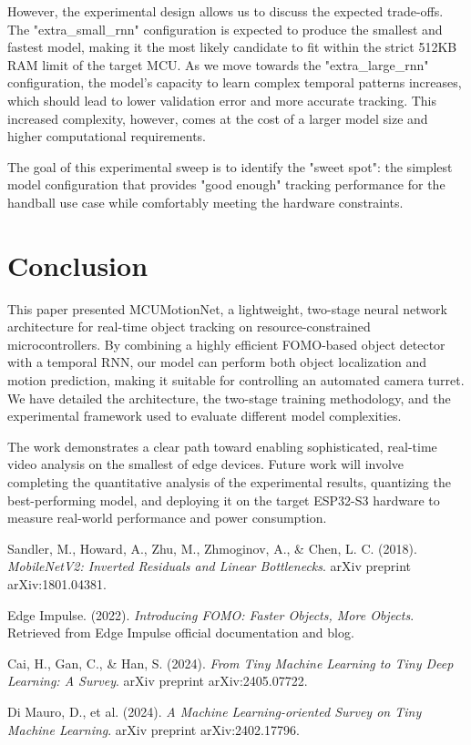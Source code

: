 \documentclass{article}
\begin{document}
However, the experimental design allows us to discuss the expected trade-offs. The "extra\_small\_rnn" configuration is expected to produce the smallest and fastest model, making it the most likely candidate to fit within the strict 512KB RAM limit of the target MCU. As we move towards the "extra\_large\_rnn" configuration, the model's capacity to learn complex temporal patterns increases, which should lead to lower validation error and more accurate tracking. This increased complexity, however, comes at the cost of a larger model size and higher computational requirements.

The goal of this experimental sweep is to identify the "sweet spot": the simplest model configuration that provides "good enough" tracking performance for the handball use case while comfortably meeting the hardware constraints.

\section{Conclusion}
This paper presented MCUMotionNet, a lightweight, two-stage neural network architecture for real-time object tracking on resource-constrained microcontrollers. By combining a highly efficient FOMO-based object detector with a temporal RNN, our model can perform both object localization and motion prediction, making it suitable for controlling an automated camera turret. We have detailed the architecture, the two-stage training methodology, and the experimental framework used to evaluate different model complexities.

The work demonstrates a clear path toward enabling sophisticated, real-time video analysis on the smallest of edge devices. Future work will involve completing the quantitative analysis of the experimental results, quantizing the best-performing model, and deploying it on the target ESP32-S3 hardware to measure real-world performance and power consumption.

\begin{thebibliography}{9}

Sandler, M., Howard, A., Zhu, M., Zhmoginov, A., \& Chen, L. C. (2018).
\textit{MobileNetV2: Inverted Residuals and Linear Bottlenecks}.
arXiv preprint arXiv:1801.04381.

Edge Impulse. (2022).
\textit{Introducing FOMO: Faster Objects, More Objects}.
Retrieved from Edge Impulse official documentation and blog.

Cai, H., Gan, C., \& Han, S. (2024).
\textit{From Tiny Machine Learning to Tiny Deep Learning: A Survey}.
arXiv preprint arXiv:2405.07722.

Di Mauro, D., et al. (2024).
\textit{A Machine Learning-oriented Survey on Tiny Machine Learning}.
arXiv preprint arXiv:2402.17796.

\end{thebibliography}
\end{document}
